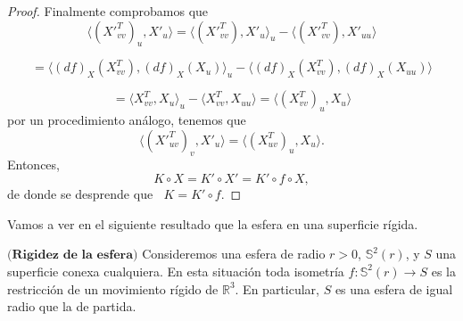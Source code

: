 \begin{proof}
	Finalmente comprobamos que
	${ }$\\
	\[
		\langle (X'^{T}_{vv})_u, X'_u \rangle = \langle (X'^{T}_{vv}), X'_u \rangle _u - \langle (X'^{T}_{vv}), X'_{uu} \rangle
	\]
	
	\[
		= \langle (df)_X(X^{T}_{vv}), (df)_X(X_u) \rangle _u - \langle (df)_X(X^{T}_{vv}), (df)_X(X_{uu}) \rangle
	\]
	
	\[
		= \langle X^{T}_{vv}, X_u \rangle _u - \langle X^{T}_{vv}, X_{uu} \rangle = \langle (X^{T}_{vv})_u, X_u \rangle
	\]
	${ }$\\
	por un procedimiento análogo, tenemos que
	${ }$\\
	\[
		\langle (X'^{T}_{uv})_v, X'_u \rangle = \langle (X^{T}_{uv})_u, X_u \rangle.
	\]
	${ }$\\	
	
	Entonces,
	${ }$\\
	\[
		K \circ X = K' \circ X' = K' \circ f \circ X,
	\]
	${ }$\\
	de donde se desprende que   $\;\; K = K' \circ f$.
	
\end{proof}
${ }$\\

Vamos a ver en el siguiente resultado que la esfera en una superficie rígida.
${ }$\\

\begin{teorema}
	$\textbf{(Rigidez de la esfera)}$ Consideremos una esfera de radio $r>0$, $\mathbb{S}^2(r)$, y $S$ una superficie conexa cualquiera. En esta situación toda isometría $f : \mathbb{S}^2(r) \to S$ es la restricción de un movimiento rígido de $\mathbb{R}^3$. En particular, $S$ es una esfera de igual radio que la de partida.
\end{teorema}

